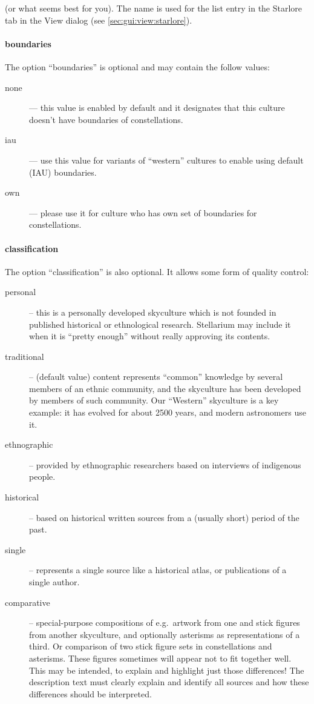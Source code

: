 \noindent (or what seems best for you). The name is used for the list entry in
the Starlore tab in the View dialog (see \ref{sec:gui:view:starlore}).

\paragraph{boundaries}
The option ``boundaries'' is optional and may contain the follow values:
\begin{description}
\item[none] --- this value is enabled by default and it designates that this culture doesn't have boundaries of constellations.
\item[iau] --- use this value for variants of ``western'' cultures to enable using default (IAU) boundaries.
\item[own] --- please use it for culture who has own set of boundaries for constellations.
\end{description}

\paragraph{classification}
The option ``classification'' is also optional.  It allows some form of quality control:
\begin{description}
  \item[personal] -- this is a personally developed skyculture which
    is not founded in published historical or ethnological research. Stellarium
    may include it when it is ``pretty enough'' without really
    approving its contents.
  \item[traditional] -- (default value) content represents ``common'' knowledge by
    several members of an ethnic community, and the skyculture has
    been developed by members of such community. Our ``Western''
    skyculture is a key example: it has evolved for about 2500 years,
    and modern astronomers use it.
  \item[ethnographic] -- provided by ethnographic researchers based on
    interviews of indigenous people.
  \item[historical] -- based on historical written sources from a
    (usually short) period of the past.
  \item[single] -- represents a single source like a historical atlas,
    or publications of a single author.
  \item[comparative] -- special-purpose compositions  of e.g.\ artwork
    from one and stick figures from another skyculture, and optionally
    asterisms as representations of a third. Or comparison of two
    stick figure sets in constellations and asterisms. These figures
    sometimes will appear not to fit together well. This may be
    intended, to explain and highlight just those differences! The
    description text must clearly explain and identify all sources and
    how these differences should be interpreted.
\end{description}

